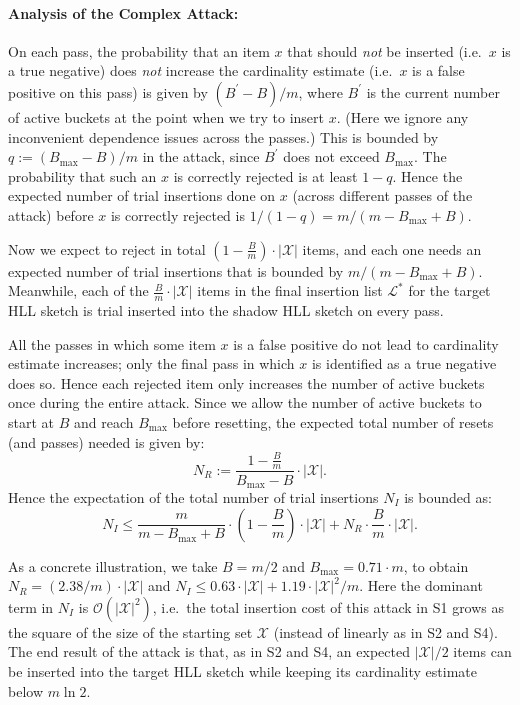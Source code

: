 \documentclass[sigconf, anonymous, dvipsnames]{acmart} %
\begin{document}
\paragraph{Analysis of the Complex Attack:}
On each pass, the probability that an item $x$ that should \emph{not} be inserted (i.e.\ $x$ is a true negative) does \emph{not} increase the cardinality estimate (i.e.\ $x$ is a false positive on this pass) is given by $(B^\prime - B)/m$, where $B^\prime$ is the current number of active buckets at the point when we try to insert $x$. (Here we ignore any inconvenient dependence issues across the passes.) This is bounded by $q := (B_{\max} - B)/m$ in the attack, since $B^\prime$ does not exceed $B_{\max}$. The probability that such an $x$ is correctly rejected is at least $1-q$. Hence the expected number of trial insertions done on $x$ (across different passes of the attack) before $x$ is correctly rejected is $1/(1-q) = m/(m - B_{\max} + B)$. 

Now we expect to reject in total $(1 - \frac{B}{m})\cdot | \mathcal{X} |$ items, and each one needs an expected number of trial insertions that is bounded by $m/(m - B_{\max} + B)$. 
Meanwhile, each of the $\frac{B}{m}\cdot | \mathcal{X} |$ items in the final insertion list ${\mathcal{L}}^*$ for the target HLL sketch is trial inserted into the shadow HLL sketch on every pass. 

All the passes in which some item $x$ is a false positive do not lead to cardinality estimate increases; only the final pass in which $x$ is identified as a true negative does so. Hence each rejected item only increases the number of active buckets once during the entire attack. Since we allow the number of active buckets to start at $B$ and reach $B_{\max}$ before resetting, the expected total number of resets (and passes) needed is given by:
\[
N_R:= \frac{1 - \frac{B}{m}}{B_{\max} - B}\cdot | \mathcal{X} |.
\]
Hence the expectation of the total number of trial insertions $N_I$ is bounded as:
\[
N_I \leq \frac{m}{ m-B_{\max} + B} \cdot \left(1 - \frac{B}{m} \right)\cdot | \mathcal{X} | +   N_R \cdot \frac{B}{m}\cdot | \mathcal{X} |.
\]
 
As a concrete illustration, we take $B = m/2$ and $B_{\max} = 0.71\cdot m$, to obtain $N_R = (2.38/m) \cdot | \mathcal{X} |$ and $N_I \leq 0.63 \cdot | \mathcal{X} | + 1.19\cdot | \mathcal{X} |^2/m$. Here the dominant term in $N_I$ is ${\mathcal{O}}(| \mathcal{X} |^2)$, i.e.\ the total insertion cost of this attack in S1 grows as the square of the size of the starting set ${\mathcal{X}}$ (instead of linearly as in S2 and S4). The end result of the attack is that, as in S2 and S4, an expected $| \mathcal{X} |/2$ items can be inserted into the target HLL sketch while keeping its cardinality estimate below $m \ln 2$.
\end{document}
